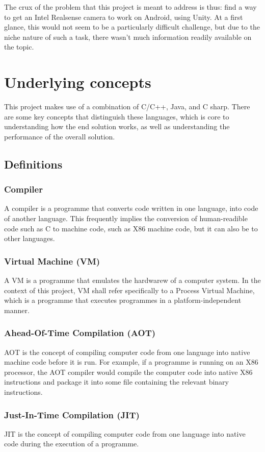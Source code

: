 The crux of the problem that this project is meant to address is thus: find a way to get an Intel Realsense camera to work on Android, using Unity. At a first glance, this would not seem to be a particularly difficult challenge, but due to the niche nature of such a task, there wasn't much information readily available on the topic.

\section{Underlying concepts}
This project makes use of a combination of C/C++, Java, and C sharp. There are some key concepts that distinguish these languages, which is core to understanding how the end solution works, as well as understanding the performance of the overall solution.
    \subsection{Definitions}
        \subsubsection{Compiler} A compiler is a programme that converts code written in one language, into code of another language. This frequently implies the conversion of human-readible code such as C to machine code, such as X86 machine code, but it can also be to other languages.
        \subsubsection{Virtual Machine (VM)} A VM is a programme that emulates the hardwarew of a computer system. In the context of this project, VM shall refer specifically to a Process Virtual Machine, which is a programme that executes programmes in a platform-independent manner.
        \subsubsection{Ahead-Of-Time Compilation (AOT)} AOT is the concept of compiling computer code from one language into native machine code before it is run. For example, if a programme is running on an X86 processor, the AOT compiler would compile the computer code into native X86 instructions and package it into some file containing the relevant binary instructions.
        \subsubsection{Just-In-Time Compilation (JIT)} JIT is the concept of compiling computer code from one language into native code during the execution of a programme.
